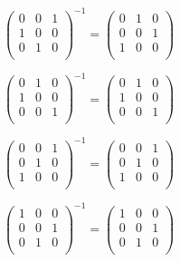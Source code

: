\documentclass[oneside,12pt]{amsart}
\begin{document}
\smallskip

$
\begin{pmatrix}
0 & 0 & 1 \\
1 & 0 & 0 \\
0 & 1 & 0 \\
\end{pmatrix}^{-1}
=
\begin{pmatrix}
0 & 1 & 0 \\
0 & 0 & 1 \\
1 & 0 & 0 \\
\end{pmatrix}
$

\smallskip

$
\begin{pmatrix}
0 & 1 & 0 \\
1 & 0 & 0 \\
0 & 0 & 1 \\
\end{pmatrix}^{-1}
=
\begin{pmatrix}
0 & 1 & 0 \\
1 & 0 & 0 \\
0 & 0 & 1 \\
\end{pmatrix}
$

\smallskip

$
\begin{pmatrix}
0 & 0 & 1 \\
0 & 1 & 0 \\
1 & 0 & 0 \\
\end{pmatrix}^{-1}
=
\begin{pmatrix}
0 & 0 & 1 \\
0 & 1 & 0 \\
1 & 0 & 0 \\
\end{pmatrix}
$

\smallskip

$
\begin{pmatrix}
1 & 0 & 0 \\
0 & 0 & 1 \\
0 & 1 & 0 \\
\end{pmatrix}^{-1}
=
\begin{pmatrix}
1 & 0 & 0 \\
0 & 0 & 1 \\
0 & 1 & 0 \\
\end{pmatrix}
$

\bigskip
\end{document}
